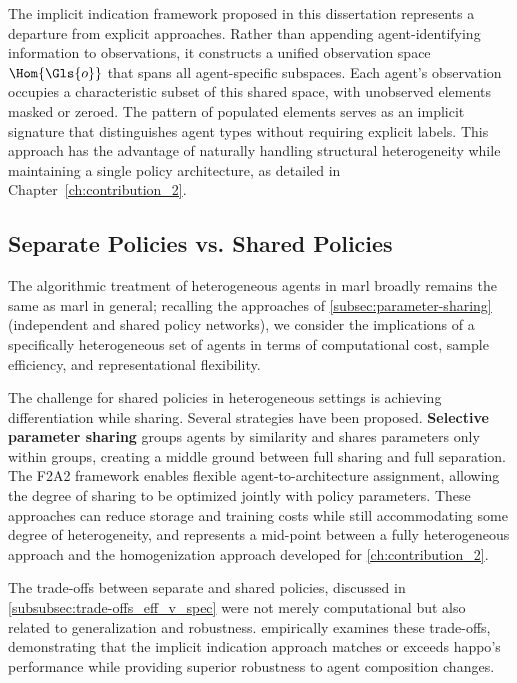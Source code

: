 The implicit indication framework proposed in this dissertation represents a 
departure from explicit approaches. Rather than appending agent-identifying 
information to observations, it constructs a unified observation space 
\(\Hom{\Gls{o}}\) that spans all agent-specific subspaces. 
Each agent's observation occupies a characteristic subset of this shared space, 
with unobserved elements masked or zeroed. The pattern of populated elements 
serves as an implicit signature that distinguishes agent types without requiring 
explicit labels. This approach has the advantage of naturally handling structural 
heterogeneity while maintaining a single policy architecture, as detailed in 
Chapter~\ref{ch:contribution_2}.

\subsection{Separate Policies vs. Shared Policies}
\label{subsec:separate-vs-shared}

The algorithmic treatment of heterogeneous agents 
in \gls{marl} broadly remains the same as \gls{marl} in general;
recalling the approaches of \cref{subsec:parameter-sharing}
(independent and shared policy networks), we consider the implications 
of a specifically heterogeneous set of agents in terms of computational 
cost, sample efficiency, and representational flexibility.

The challenge for shared policies in heterogeneous settings is achieving 
differentiation while sharing. Several strategies have been proposed. 
\textbf{Selective parameter sharing} \cite{christianos2021} groups 
agents by similarity and shares parameters only within groups, 
creating a middle ground between full sharing and full separation. 
The F2A2 framework \cite{li2023d} enables flexible agent-to-architecture assignment, 
allowing the degree of sharing to be optimized jointly with policy parameters. 
These approaches can reduce storage and training costs while still 
accommodating some degree of heterogeneity,
and represents a mid-point between a fully heterogeneous approach and
the homogenization approach developed for \cref{ch:contribution_2}.

The trade-offs between separate and shared policies, 
discussed in \cref{subsubsec:trade-offs_eff_v_spec} were not merely 
computational but also related to generalization and robustness. 
 empirically examines these trade-offs, 
demonstrating that the implicit indication approach matches or exceeds 
\gls{happo}'s performance while providing superior robustness to agent 
composition changes.

